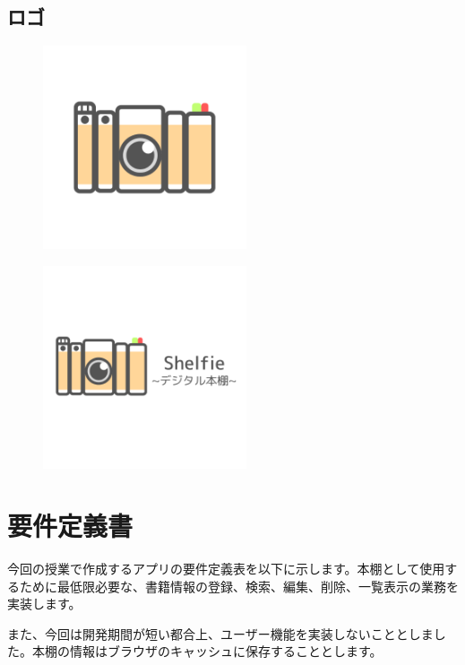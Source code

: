 \documentclass[a4paper, 11pt, titlepage]{jsarticle}
\begin{document}
\clearpage

\subsection{ロゴ}
\begin{figure}[htbp]
\centering
\includegraphics[width=60mm] {shelfie_logo.png}
\label{fig:func}
\end{figure}

\begin{figure}[htbp]
\centering
\includegraphics[width=60mm] {shelfie_logo2.png}
\label{fig:func}
\end{figure}

\clearpage

\section{要件定義書}%
今回の授業で作成するアプリの要件定義表を以下に示します。本棚として使用するために最低限必要な、書籍情報の登録、検索、編集、削除、一覧表示の業務を実装します。

また、今回は開発期間が短い都合上、ユーザー機能を実装しないこととしました。本棚の情報はブラウザのキャッシュに保存することとします。
\end{document}
